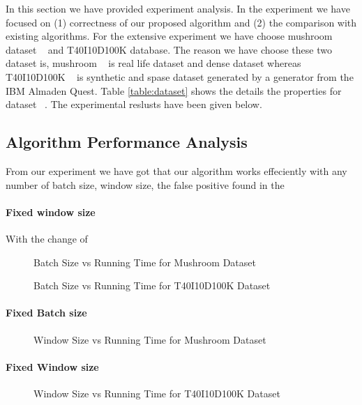 In this section we have provided experiment analysis. In the experiment we have focused on (1) correctness of our proposed algorithm and (2) the comparison with existing algorithms. For the extensive experiment we have choose mushroom dataset ~\cite{dataset} and T40I10D100K database. The reason we have choose these two dataset is, mushroom ~\cite{dataset} is real life dataset and dense dataset whereas T40I10D100K ~\cite{dataset} is synthetic and spase dataset generated by a generator from the IBM Almaden Quest. Table \ref{table:dataset} shows the details the properties for dataset ~\cite{dataset}. The experimental reslusts have been given below.
	\subsection{Algorithm Performance Analysis}
	From our experiment we have got that our algorithm works effeciently with any number of batch size, window size, the false positive found in the 
		\paragraph{Fixed window size}
		With the change of 
		
		\begin{figure}[h]
		\centering
			
		\caption{Batch Size vs Running Time for Mushroom Dataset ~\cite{dataset}}
		\label{result:g_m_const_batch}
		\end{figure}
		\begin{figure}[h]
		\centering
			
		\caption{Batch Size vs Running Time for T40I10D100K Dataset ~\cite{dataset}}
		\label{result:g_t10_const_batch}
		\end{figure}
		
		\paragraph{Fixed Batch size}
		\begin{figure}[h]
		\centering
			
		\caption{Window Size vs Running Time for Mushroom Dataset ~\cite{dataset}}
		\label{result:g_m_const_win}
		\end{figure}
		\paragraph{Fixed Window size}
		\begin{figure}[h]
		\centering
			
		\caption{Window Size vs Running Time for T40I10D100K Dataset ~\cite{dataset}}
		\label{result:g_t10_const_win}
		\end{figure}
		
